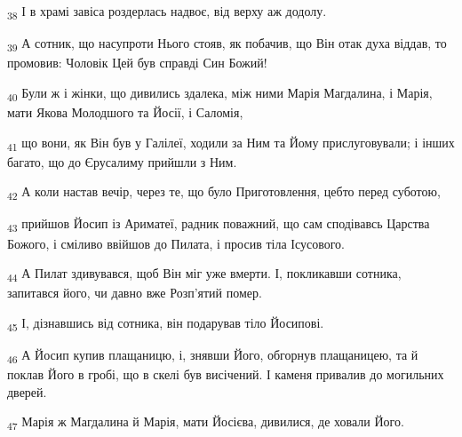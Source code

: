 \begin{tcolorbox}
\textsubscript{38} І в храмі завіса роздерлась надвоє, від верху аж додолу.
\end{tcolorbox}
\begin{tcolorbox}
\textsubscript{39} А сотник, що насупроти Нього стояв, як побачив, що Він отак духа віддав, то промовив: Чоловік Цей був справді Син Божий!
\end{tcolorbox}
\begin{tcolorbox}
\textsubscript{40} Були ж і жінки, що дивились здалека, між ними Марія Магдалина, і Марія, мати Якова Молодшого та Йосії, і Саломія,
\end{tcolorbox}
\begin{tcolorbox}
\textsubscript{41} що вони, як Він був у Галілеї, ходили за Ним та Йому прислуговували; і інших багато, що до Єрусалиму прийшли з Ним.
\end{tcolorbox}
\begin{tcolorbox}
\textsubscript{42} А коли настав вечір, через те, що було Приготовлення, цебто перед суботою,
\end{tcolorbox}
\begin{tcolorbox}
\textsubscript{43} прийшов Йосип із Ариматеї, радник поважний, що сам сподівавсь Царства Божого, і сміливо ввійшов до Пилата, і просив тіла Ісусового.
\end{tcolorbox}
\begin{tcolorbox}
\textsubscript{44} А Пилат здивувався, щоб Він міг уже вмерти. І, покликавши сотника, запитався його, чи давно вже Розп'ятий помер.
\end{tcolorbox}
\begin{tcolorbox}
\textsubscript{45} І, дізнавшись від сотника, він подарував тіло Йосипові.
\end{tcolorbox}
\begin{tcolorbox}
\textsubscript{46} А Йосип купив плащаницю, і, знявши Його, обгорнув плащаницею, та й поклав Його в гробі, що в скелі був висічений. І каменя привалив до могильних дверей.
\end{tcolorbox}
\begin{tcolorbox}
\textsubscript{47} Марія ж Магдалина й Марія, мати Йосієва, дивилися, де ховали Його.
\end{tcolorbox}
